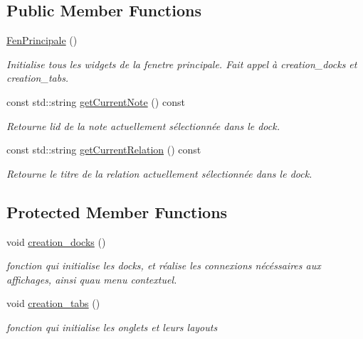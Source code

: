 \subsection*{Public Member Functions}
\begin{DoxyCompactItemize}
\item 
\hyperlink{class_fen_principale_a529a35ea032da250ad37f7355d1388be}{Fen\+Principale} ()
\begin{DoxyCompactList}\small\item\em Initialise tous les widgets de la fenetre principale. Fait appel à creation\+\_\+docks et creation\+\_\+tabs. \end{DoxyCompactList}\item 
\mbox{\label{class_fen_principale_a693e4a09cc7dd941184d0ea7860409da}} 
const std\+::string \hyperlink{class_fen_principale_a693e4a09cc7dd941184d0ea7860409da}{get\+Current\+Note} () const
\begin{DoxyCompactList}\small\item\em Retourne l\textquotesingle{}id de la note actuellement sélectionnée dans le dock. \end{DoxyCompactList}\item 
\mbox{\label{class_fen_principale_afe1f6fbbdd799fa55e804343ce4583af}} 
const std\+::string \hyperlink{class_fen_principale_afe1f6fbbdd799fa55e804343ce4583af}{get\+Current\+Relation} () const
\begin{DoxyCompactList}\small\item\em Retourne le titre de la relation actuellement sélectionnée dans le dock. \end{DoxyCompactList}\end{DoxyCompactItemize}
\subsection*{Protected Member Functions}
\begin{DoxyCompactItemize}
\item 
void \hyperlink{class_fen_principale_ab3ef99b1adb06c0bcc57ea74ca34923e}{creation\+\_\+docks} ()
\begin{DoxyCompactList}\small\item\em fonction qui initialise les docks, et réalise les connexions nécéssaires aux affichages, ainsi qu\textquotesingle{}au menu contextuel. \end{DoxyCompactList}\item 
\mbox{\label{class_fen_principale_aa5ea82e9b0e1c9f93d496cad531ca9e1}} 
void \hyperlink{class_fen_principale_aa5ea82e9b0e1c9f93d496cad531ca9e1}{creation\+\_\+tabs} ()
\begin{DoxyCompactList}\small\item\em fonction qui initialise les onglets et leurs layouts \end{DoxyCompactList}\end{DoxyCompactItemize}

